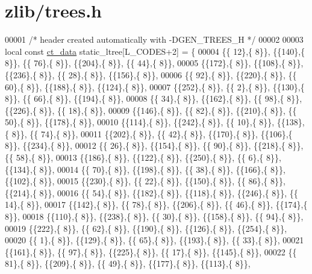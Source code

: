 \hypertarget{zlib_2trees_8h_source}{}\section{zlib/trees.h}
\label{zlib_2trees_8h_source}

\begin{DoxyCode}
00001 \textcolor{comment}{/* header created automatically with -DGEN\_TREES\_H */}
00002 
00003 local \textcolor{keyword}{const} \hyperlink{structct__data__s}{ct\_data} static\_ltree[L\_CODES+2] = \{
00004 \{\{ 12\},\{  8\}\}, \{\{140\},\{  8\}\}, \{\{ 76\},\{  8\}\}, \{\{204\},\{  8\}\}, \{\{ 44\},\{  8\}\},
00005 \{\{172\},\{  8\}\}, \{\{108\},\{  8\}\}, \{\{236\},\{  8\}\}, \{\{ 28\},\{  8\}\}, \{\{156\},\{  8\}\},
00006 \{\{ 92\},\{  8\}\}, \{\{220\},\{  8\}\}, \{\{ 60\},\{  8\}\}, \{\{188\},\{  8\}\}, \{\{124\},\{  8\}\},
00007 \{\{252\},\{  8\}\}, \{\{  2\},\{  8\}\}, \{\{130\},\{  8\}\}, \{\{ 66\},\{  8\}\}, \{\{194\},\{  8\}\},
00008 \{\{ 34\},\{  8\}\}, \{\{162\},\{  8\}\}, \{\{ 98\},\{  8\}\}, \{\{226\},\{  8\}\}, \{\{ 18\},\{  8\}\},
00009 \{\{146\},\{  8\}\}, \{\{ 82\},\{  8\}\}, \{\{210\},\{  8\}\}, \{\{ 50\},\{  8\}\}, \{\{178\},\{  8\}\},
00010 \{\{114\},\{  8\}\}, \{\{242\},\{  8\}\}, \{\{ 10\},\{  8\}\}, \{\{138\},\{  8\}\}, \{\{ 74\},\{  8\}\},
00011 \{\{202\},\{  8\}\}, \{\{ 42\},\{  8\}\}, \{\{170\},\{  8\}\}, \{\{106\},\{  8\}\}, \{\{234\},\{  8\}\},
00012 \{\{ 26\},\{  8\}\}, \{\{154\},\{  8\}\}, \{\{ 90\},\{  8\}\}, \{\{218\},\{  8\}\}, \{\{ 58\},\{  8\}\},
00013 \{\{186\},\{  8\}\}, \{\{122\},\{  8\}\}, \{\{250\},\{  8\}\}, \{\{  6\},\{  8\}\}, \{\{134\},\{  8\}\},
00014 \{\{ 70\},\{  8\}\}, \{\{198\},\{  8\}\}, \{\{ 38\},\{  8\}\}, \{\{166\},\{  8\}\}, \{\{102\},\{  8\}\},
00015 \{\{230\},\{  8\}\}, \{\{ 22\},\{  8\}\}, \{\{150\},\{  8\}\}, \{\{ 86\},\{  8\}\}, \{\{214\},\{  8\}\},
00016 \{\{ 54\},\{  8\}\}, \{\{182\},\{  8\}\}, \{\{118\},\{  8\}\}, \{\{246\},\{  8\}\}, \{\{ 14\},\{  8\}\},
00017 \{\{142\},\{  8\}\}, \{\{ 78\},\{  8\}\}, \{\{206\},\{  8\}\}, \{\{ 46\},\{  8\}\}, \{\{174\},\{  8\}\},
00018 \{\{110\},\{  8\}\}, \{\{238\},\{  8\}\}, \{\{ 30\},\{  8\}\}, \{\{158\},\{  8\}\}, \{\{ 94\},\{  8\}\},
00019 \{\{222\},\{  8\}\}, \{\{ 62\},\{  8\}\}, \{\{190\},\{  8\}\}, \{\{126\},\{  8\}\}, \{\{254\},\{  8\}\},
00020 \{\{  1\},\{  8\}\}, \{\{129\},\{  8\}\}, \{\{ 65\},\{  8\}\}, \{\{193\},\{  8\}\}, \{\{ 33\},\{  8\}\},
00021 \{\{161\},\{  8\}\}, \{\{ 97\},\{  8\}\}, \{\{225\},\{  8\}\}, \{\{ 17\},\{  8\}\}, \{\{145\},\{  8\}\},
00022 \{\{ 81\},\{  8\}\}, \{\{209\},\{  8\}\}, \{\{ 49\},\{  8\}\}, \{\{177\},\{  8\}\}, \{\{113\},\{  8\}\},

\end{DoxyCode}
